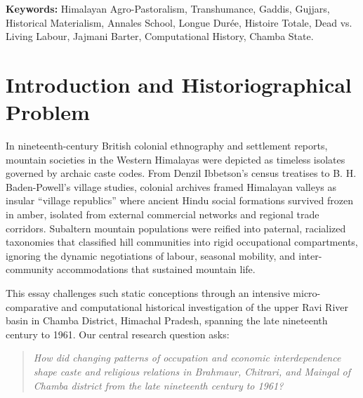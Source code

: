 \documentclass[11pt,a4paper]{article}
\begin{document}
\vspace{0.5em}
\noindent\textbf{Keywords:} Himalayan Agro-Pastoralism, Transhumance, Gaddis, Gujjars, Historical Materialism, Annales School, Longue Dur\'ee, Histoire Totale, Dead vs. Living Labour, Jajmani Barter, Computational History, Chamba State.

\newpage
\tableofcontents
\newpage

\section{Introduction and Historiographical Problem}

In nineteenth-century British colonial ethnography and settlement reports, mountain societies in the Western Himalayas were depicted as timeless isolates governed by archaic caste codes. From Denzil Ibbetson's census treatises to B. H. Baden-Powell's village studies, colonial archives framed Himalayan valleys as insular ``village republics'' where ancient Hindu social formations survived frozen in amber, isolated from external commercial networks and regional trade corridors. Subaltern mountain populations were reified into paternal, racialized taxonomies that classified hill communities into rigid occupational compartments, ignoring the dynamic negotiations of labour, seasonal mobility, and inter-community accommodations that sustained mountain life.

This essay challenges such static conceptions through an intensive micro-comparative and computational historical investigation of the upper Ravi River basin in Chamba District, Himachal Pradesh, spanning the late nineteenth century to 1961. Our central research question asks:
\begin{quote}
\textit{How did changing patterns of occupation and economic interdependence shape caste and religious relations in Brahmaur, Chitrari, and Maingal of Chamba district from the late nineteenth century to 1961?}
\end{quote}
\end{document}
